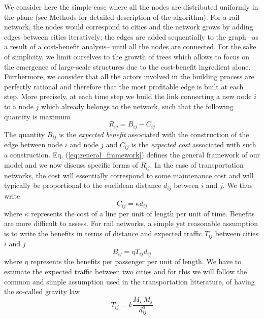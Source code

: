 We consider here the simple case where all the nodes are distributed uniformly in the plane (see Methods for detailed description of the algorithm). For a rail network, the nodes would correspond to cities and the network grows by adding edges between cities iteratively; the edges are added sequentially to the graph --as a result of a cost-benefit analysis-- until all the nodes are connected. For the sake of simplicity, we limit ourselves to the growth of trees which allows to focus on the emergence of large-scale structures due to the cost-benefit ingredient alone.  Furthermore, we consider that all the actors involved in the building process are perfectly rational and therefore that the most profitable edge is built at each step. More precisely, at each time step we build the link connecting a new node $i$ to a node $j$ which already belongs to the network, such that the following quantity is maximum
%
\begin{equation}
\label{eq:general_framework}
R_{ij} = B_{ij} - C_{ij}
\end{equation}
The quantity $B_{ij}$ is the \textit{expected benefit} associated with the construction of the edge between node $i$ and node $j$ and $C_{ij}$ is the \textit{expected cost} associated with such a construction. Eq. (\ref{eq:general_framework}) defines the general framework of our model and we now discuss specific forms of $R_{ij}$. In the case of transportation networks, the cost will essentially correspond to some maintenance cost and will typically be proportional to the euclidean distance $d_{ij}$ between $i$ and $j$. We thus write
\begin{equation}
\label{eq:cost}
C_{ij} = \kappa d_{ij}
\end{equation}
where $\kappa$ represents the cost of a line per unit of length per unit of time. Benefits are more difficult to assess. For rail networks, a simple yet reasonable assumption is to write the benefits in terms of distance and expected traffic $T_{ij}$ between cities $i$ and $j$ 
\begin{equation} 
\label{eq:benefits} 
B_{ij} = \eta T_{ij} d_{ij}
\end{equation}
where $\eta$ represents the benefits per passenger per unit of length. We have to estimate the expected traffic between two cities and for this we will follow the common and simple assumption used in the transportation litterature, of having the so-called gravity law ~\cite{Stewart:1948,Erlander:1990}
\begin{equation} 
\label{eq:gravity} 
T_{ij} = k\frac{M_i \: M_j}{d_{ij}^a} 
\end{equation}
